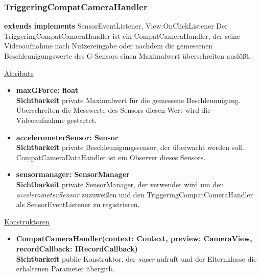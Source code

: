 \subsubsection{TriggeringCompatCameraHandler} \label{app:klasse:TriggeringCompatCameraHandler}
\textbf{extends} \newline
\textbf{implements} SensorEventListener, View.OnClickListener \newline
Der TriggeringCompatCameraHandler ist ein CompatCameraHandler, der seine Videoaufnahme nach Nutzereingabe oder nachdem die gemessenen Beschleunigungswerte des G-Sensors einen Maximalwert überschreiten auslößt.
\newline

\underline{Attribute}
\begin{itemize}
\itemsep0pt
\item \textbf{maxGForce: float} \hfill\\ 
\textbf{Sichtbarkeit} private \newline
Maximalwert für die gemessene Beschleunuigung. Überschreiten die Messwerte des Sensors diesen Wert wird die Videoaufnahme gestartet.

\item \textbf{accelerometerSensor: Sensor} \hfill\\ 
\textbf{Sichtbarkeit} private \newline
Beschleunigungssensor, der überwacht werden soll. CompatCameraDataHandler ist ein Observer dieses Sensors.

\item \textbf{sensormanager: SensorManager} \hfill\\ 
\textbf{Sichtbarkeit} private \newline
SensorManager, der verwendet wird um den \textit{accelerometerSensor} zuzuweißen und den TriggeringCompatCameraHandler als SensorEventListener zu registrieren.
\end{itemize}

\underline{Konstruktoren}
\begin{itemize}
\itemsep0pt
\item \textbf{CompatCameraHandler(context: Context, preview: CameraView, recordCallback: IRecordCallback)} \hfill\\
\textbf{Sichtbarkeit} public\newline
Konstruktor, der \textit{super} aufruft und der Elternklasse die erhaltenen Parameter übergitb.
\end{itemize}

